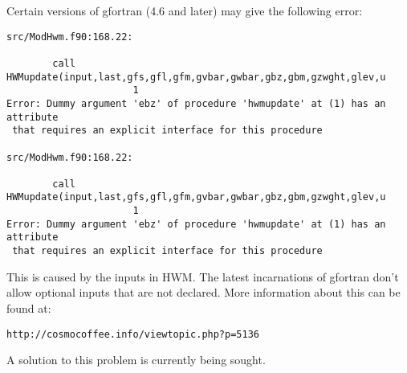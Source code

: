 Certain versions of gfortran (4.6 and later) may give the following error:

\begin{verbatim}
src/ModHwm.f90:168.22:

        call HWMupdate(input,last,gfs,gfl,gfm,gvbar,gwbar,gbz,gbm,gzwght,glev,u
                      1
Error: Dummy argument 'ebz' of procedure 'hwmupdate' at (1) has an attribute
 that requires an explicit interface for this procedure

src/ModHwm.f90:168.22:

        call HWMupdate(input,last,gfs,gfl,gfm,gvbar,gwbar,gbz,gbm,gzwght,glev,u
                      1
Error: Dummy argument 'ebz' of procedure 'hwmupdate' at (1) has an attribute
 that requires an explicit interface for this procedure
\end{verbatim}

This is caused by the inputs in HWM.  The latest incarnations of gfortran don't allow optional inputs that are not declared.  More information about this can be found at:

\begin{verbatim}
http://cosmocoffee.info/viewtopic.php?p=5136
\end{verbatim}

A solution to this problem is currently being sought.
